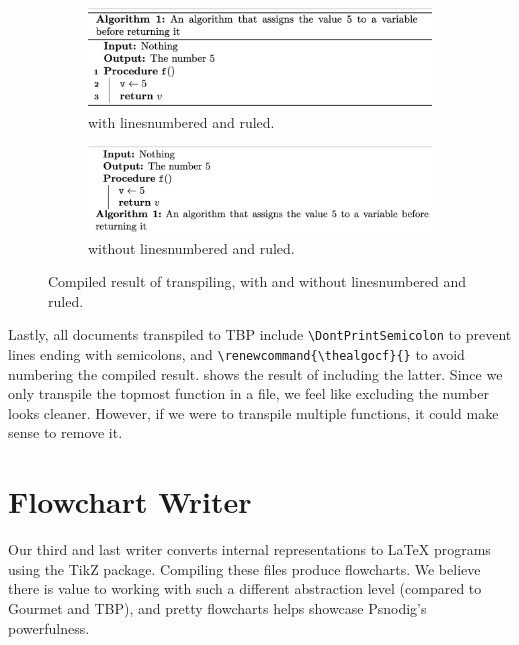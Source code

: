\begin{figure}[ht]
\centering
\begin{subfigure}{.5\textwidth}
  \centering
  \includegraphics[width=.9\linewidth]{assets/return5pretty.png}
  \caption{ with linesnumbered and ruled.}
  \label{f with linesnumbered and ruled.}
\end{subfigure}%
\begin{subfigure}{.5\textwidth}
  \centering
  \includegraphics[width=.9\linewidth]{assets/return5ugly.png}
  \caption{ without linesnumbered and ruled.}
  \label{f without plain Algorithm2e.}
\end{subfigure}
\caption{Compiled result of transpiling, with and without linesnumbered and ruled.}
\label{algoWithAndWithoutParams}
\end{figure}

Lastly, all documents transpiled to TBP include \texttt{\textbackslash DontPrintSemicolon} to prevent lines ending with semicolons, and \texttt{\textbackslash renewcommand\{\textbackslash thealgocf\}\{\}} to avoid numbering the compiled result.  shows the result of including the latter. Since we only transpile the topmost function in a file, we feel like excluding the number looks cleaner. However, if we were to transpile multiple functions, it could make sense to remove it.

\section{Flowchart Writer}

Our third and last writer converts internal representations to LaTeX programs using the TikZ package. Compiling these files produce flowcharts. We believe there is value to working with such a different abstraction level (compared to Gourmet and TBP), and pretty flowcharts helps showcase Psnodig's powerfulness. \\

